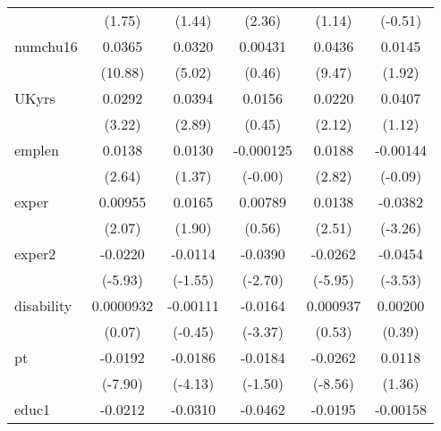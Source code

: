 \begin{table}[htbp]
\begin{tabular}{l*{5}{c}}
            &      (1.75)         &      (1.44)         &      (2.36)         &      (1.14)         &     (-0.51)         \\
numchu16    &      0.0365\sym{***}&      0.0320\sym{***}&     0.00431         &      0.0436\sym{***}&      0.0145         \\
            &     (10.88)         &      (5.02)         &      (0.46)         &      (9.47)         &      (1.92)         \\
UKyrs       &      0.0292\sym{**} &      0.0394\sym{**} &      0.0156         &      0.0220\sym{*}  &      0.0407         \\
            &      (3.22)         &      (2.89)         &      (0.45)         &      (2.12)         &      (1.12)         \\
emplen      &      0.0138\sym{**} &      0.0130         &   -0.000125         &      0.0188\sym{**} &    -0.00144         \\
            &      (2.64)         &      (1.37)         &     (-0.00)         &      (2.82)         &     (-0.09)         \\
exper       &     0.00955\sym{*}  &      0.0165         &     0.00789         &      0.0138\sym{*}  &     -0.0382\sym{**} \\
            &      (2.07)         &      (1.90)         &      (0.56)         &      (2.51)         &     (-3.26)         \\
exper2      &     -0.0220\sym{***}&     -0.0114         &     -0.0390\sym{**} &     -0.0262\sym{***}&     -0.0454\sym{***}\\
            &     (-5.93)         &     (-1.55)         &     (-2.70)         &     (-5.95)         &     (-3.53)         \\
disability  &   0.0000932         &    -0.00111         &     -0.0164\sym{***}&    0.000937         &     0.00200         \\
            &      (0.07)         &     (-0.45)         &     (-3.37)         &      (0.53)         &      (0.39)         \\
pt          &     -0.0192\sym{***}&     -0.0186\sym{***}&     -0.0184         &     -0.0262\sym{***}&      0.0118         \\
            &     (-7.90)         &     (-4.13)         &     (-1.50)         &     (-8.56)         &      (1.36)         \\
educ1       &     -0.0212\sym{***}&     -0.0310\sym{***}&     -0.0462\sym{***}&     -0.0195\sym{***}&    -0.00158         \\

\end{tabular}
\end{table}
